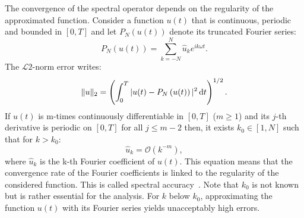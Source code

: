 
The convergence of the spectral operator depends on
the regularity of the approximated function. Consider a function
$u(t)$ that is continuous, periodic and bounded in $[0,T]$
and let $P_N \left(u(t)\right)$ denote its truncated Fourier series:
\begin{equation}
    P_N \left(u(t)\right) = \sum_{k=-N}^{N} \widehat{u}_k e^{i k\omega t}.
\end{equation}
The $\mathcal{L}2$-norm error writes:
\begin{equation}
   \| u \|_2 = \left(\int_0^T |u(t) - P_N \left(u(t)\right)|^2 \mathop{}\!\mathrm{d} t \right)^{1/2}.
\end{equation}
If $u(t)$ is m-times continuously differentiable in $[0,T]$ ($m \geq 1$) 
and its $j$-th derivative is periodic on $[0,T]$ for all $j \leq m - 2$
then, it exists  $k_0 \in [1, N]$ such that for $k > k_0$:
\begin{equation}
    \widehat{u}_k = \mathcal{O} (k^{-m}),
\end{equation}
where $\widehat{u}_k$ is the k-th Fourier coefficient of $u(t)$.
This equation means that the convergence rate of the Fourier
coefficients is linked to the regularity of the considered function.
This is called spectral accuracy~\cite{Canuto2006}. Note that
$k_0$ is not known but is rather essential for the analysis.
For $k$ below $k_0$, approximating the function $u(t)$ with its Fourier
series yields unacceptably high errors.